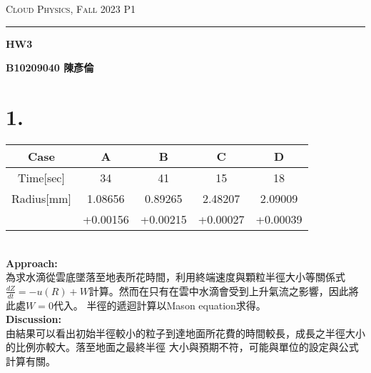\documentclass{article}
\author{B10209040 陳彥倫}
\begin{document}
\thispagestyle{empty}
\hfill {\scshape \large Cloud Physics, Fall 2023 } \hfill {\scshape P1}
\smallskip
\hrule
\begin{CJK*}{UTF8}{bsmi}
\bigskip
\bigskip
\bigskip

\centerline{\huge \textbf {HW3}}
\bigskip
\centerline{\textbf {B10209040 陳彥倫}}

\section*{1.}

\begin{center}
    \begin{adjustbox}{width=150mm,center}
        \begin{tabular}{||c|c | c | c | c ||} 
            \hline
            Case & A & B & C & D \\ [1ex] 
            \hline\hline
            Time[sec] & 34 & 41 & 15 & 18 \\ [1ex] 
            \hline
            Radius[mm] & 1.08656 & 0.89265 & 2.48207 & 2.09009 \\ [1ex] 
            \hline
                    & +0.00156 & +0.00215 & +0.00027 & +0.00039 \\ [1ex] 
            \hline
        \end{tabular}
    \end{adjustbox}
\end{center}

\begin{spacing}{2}
    \begin{large}
        \: \\
        \textbf{Approach:} \\
        為求水滴從雲底墜落至地表所花時間，利用終端速度與顆粒半徑大小等關係式\\
        $\frac{dZ}{dt} = -u(R) + W$計算。然而在只有在雲中水滴會受到上升氣流之影響，因此將此處$W = 0$代入。
        半徑的遞迴計算以Mason equation求得。\\
        \textbf{Discussion:} \\
        由結果可以看出初始半徑較小的粒子到達地面所花費的時間較長，成長之半徑大小的比例亦較大。落至地面之最終半徑
        大小與預期不符，可能與單位的設定與公式計算有關。

        
        

        
    \end{large}
\end{spacing}

\end{CJK*}
\end{document}
